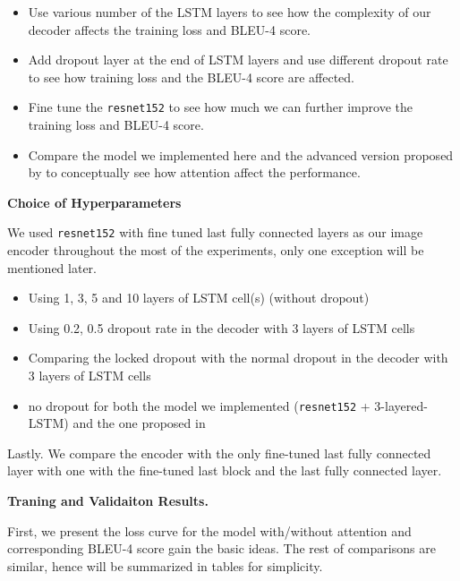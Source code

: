 \documentclass[fleqn,10pt]{SelfArx} %
\begin{document}
\begin{itemize}

    \item Use various number of the LSTM layers to see how the complexity of our decoder affects the training loss and BLEU-4 score.

    \item Add dropout layer at the end of LSTM layers and use different dropout rate to see how training loss and the BLEU-4 score are affected.

    \item Fine tune the \verb|resnet152| to see how much we can further improve the training loss and BLEU-4 score.

    \item Compare the model we implemented here and the advanced version proposed by \cite{sat} to conceptually see how attention affect the performance. 
\end{itemize}

\textbf{Choice of Hyperparameters}

We used \verb|resnet152| with fine tuned last fully connected layers as our image encoder throughout the most of the experiments, only one exception will be mentioned later.
\begin{itemize}

    \item Using 1, 3, 5 and 10 layers of LSTM cell(s) (without dropout)

    \item Using 0.2, 0.5 dropout rate in the decoder with 3 layers of LSTM cells

    \item Comparing the locked dropout with the normal dropout in the decoder with 3 layers of LSTM cells

    \item no dropout for both the model we implemented (\verb|resnet152| + 3-layered-LSTM) and the one proposed in \cite{sat} 

\end{itemize}

 Lastly. We compare the encoder with the only fine-tuned last fully connected layer with one with the fine-tuned last block and the last fully connected layer. 

\textbf{Traning and Validaiton Results.}

First, we present the loss curve for the model with/without attention and corresponding BLEU-4 score gain the basic ideas. The rest of comparisons are similar, hence will be summarized in tables for simplicity.
\end{document}
